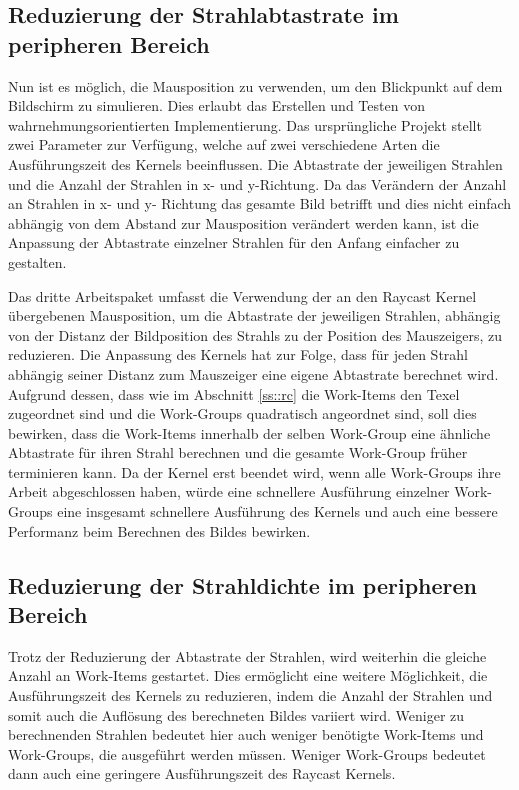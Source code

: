 \subsection{Reduzierung der Strahlabtastrate im peripheren Bereich}\label{sec::workpacks::ors}
Nun ist es möglich, die Mausposition zu verwenden, um den Blickpunkt auf dem Bildschirm zu simulieren.
Dies erlaubt das Erstellen und Testen von wahrnehmungsorientierten Implementierung. 
Das ursprüngliche Projekt stellt zwei Parameter zur Verfügung, welche auf zwei verschiedene Arten die Ausführungszeit des Kernels beeinflussen.
Die Abtastrate der jeweiligen Strahlen und die Anzahl der Strahlen in x- und y-Richtung.
Da das Verändern der Anzahl an Strahlen in x- und y- Richtung das gesamte Bild betrifft und dies nicht einfach abhängig von dem Abstand zur Mausposition verändert werden kann, ist die Anpassung der Abtastrate einzelner Strahlen für den Anfang einfacher zu gestalten.

Das dritte Arbeitspaket umfasst die Verwendung der an den Raycast Kernel übergebenen Mausposition, um die Abtastrate der jeweiligen Strahlen, abhängig von der Distanz der Bildposition des Strahls zu der Position des Mauszeigers, zu reduzieren.
Die Anpassung des Kernels hat zur Folge, dass für jeden Strahl abhängig seiner Distanz zum Mauszeiger eine eigene Abtastrate berechnet wird.
Aufgrund dessen, dass wie im Abschnitt \ref{ss::rc} die Work-Items den Texel zugeordnet sind und die Work-Groups quadratisch angeordnet sind, soll dies bewirken, dass die Work-Items innerhalb der selben Work-Group eine ähnliche Abtastrate für ihren Strahl berechnen und die gesamte Work-Group früher terminieren kann.
Da der Kernel erst beendet wird, wenn alle Work-Groups ihre Arbeit abgeschlossen haben, würde eine schnellere Ausführung einzelner Work-Groups eine insgesamt schnellere Ausführung des Kernels und auch eine bessere Performanz beim Berechnen des Bildes bewirken.

\subsection{Reduzierung der Strahldichte im peripheren Bereich}\label{ss::MDC}
Trotz der Reduzierung der Abtastrate der Strahlen, wird weiterhin die gleiche Anzahl an Work-Items gestartet.
Dies ermöglicht eine weitere Möglichkeit, die Ausführungszeit des Kernels zu reduzieren, indem die Anzahl der Strahlen und somit auch die Auflösung des berechneten Bildes variiert wird.
Weniger zu berechnenden Strahlen bedeutet hier auch weniger benötigte Work-Items und Work-Groups, die ausgeführt werden müssen.
Weniger Work-Groups bedeutet dann auch eine geringere Ausführungszeit des Raycast Kernels.

